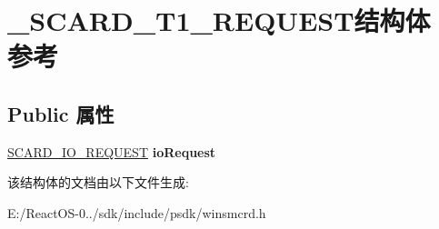 \hypertarget{struct___s_c_a_r_d___t1___r_e_q_u_e_s_t}{}\section{\+\_\+\+S\+C\+A\+R\+D\+\_\+\+T1\+\_\+\+R\+E\+Q\+U\+E\+S\+T结构体 参考}
\label{struct___s_c_a_r_d___t1___r_e_q_u_e_s_t}
\subsection*{Public 属性}
\begin{DoxyCompactItemize}
\item 
\mbox{\label{struct___s_c_a_r_d___t1___r_e_q_u_e_s_t_a559d2706c5924303b5e40bb0aa17c862}} 
\hyperlink{struct___s_c_a_r_d___i_o___r_e_q_u_e_s_t}{S\+C\+A\+R\+D\+\_\+\+I\+O\+\_\+\+R\+E\+Q\+U\+E\+ST} {\bfseries io\+Request}
\end{DoxyCompactItemize}


该结构体的文档由以下文件生成\+:\begin{DoxyCompactItemize}
\item 
E\+:/\+React\+O\+S-\/0../sdk/include/psdk/winsmcrd.\+h\end{DoxyCompactItemize}
